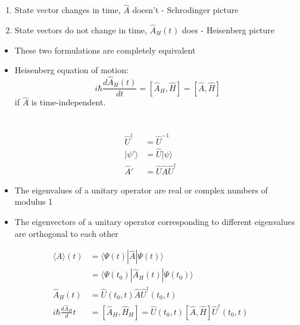\documentclass[a4paper,11pt,normalem]{article}
\begin{document}
\begin{enumerate}
\item
  State vector changes in time, \(\hat{A}\) doesn't - Schrodinger
  picture
\item
  State vectors do not change in time, \(\hat{A}_H(t_{})\) does -
  Heisenberg picture
\end{enumerate}

\begin{itemize}
\item
  These two formulations are completely equivalent
\item
  Heisenberg equation of motion:
\[
    i\hbar\frac{d\hat{A}_H(t)}{dt} = [\hat{A}_H,\hat{H}] = [\hat{A},\hat{H}]
\]
if \(\hat{A}\) is time-independent.
\end{itemize}

\section{}\label{lecture-14}

\[
    \begin{aligned}
    \hat{U}^\dagger &= \hat{U}^{-1} \\
    |\psi'\rangle &= \hat{U}|\psi\rangle \\
    \hat{A}' &= \hat{U}\hat{A}\hat{U}^\dagger
    \end{aligned}
\]

\begin{itemize}
\item
  The eigenvalues of a unitary operator are real or complex numbers of
  modulus 1
\item
  The eigenvectors of a unitary operator corresponding to different
  eigenvalues are orthogonal to each other
\end{itemize}

\[
    \begin{aligned}
    \langle A\rangle(t) &= \langle\Psi(t)|\hat{A}|\Psi(t)\rangle \\
    &= \langle\Psi(t_0)|\hat{A}_H(t)|\Psi(t_0)\rangle \\
    \hat{A}_H(t) &= \hat{U}(t_0,t)\hat{A}\hat{U}^\dagger(t_0,t) \\
    i\hbar\frac{d\hat{A}_H}dt &= [\hat{A}_H,\hat{H}_H] = \hat{U}(t_0,t)[\hat{A},\hat{H}]\hat{U}^\dagger(t_0,t)
    \end{aligned}
\]
\end{document}
